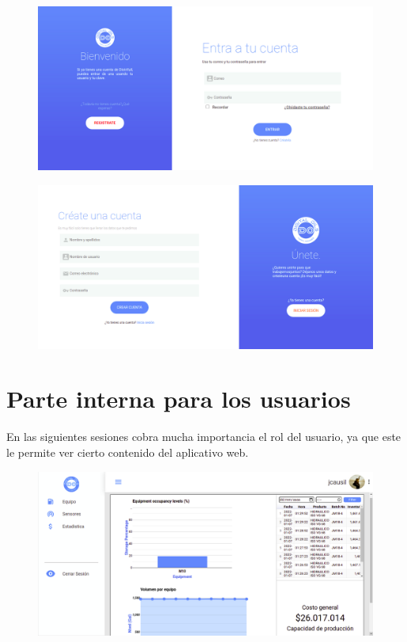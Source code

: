 \begin{figure}[!]
	\centering
	\includegraphics[width=1\linewidth, height=0.4\textheight]{imagenes/inicioSesion}
	\caption[Inicio de sesi\'on.]{}
	\label{fig:iniciosesion}
\end{figure}

\begin{figure}[!]
	\centering
	\includegraphics[width=1\linewidth, height=0.4\textheight]{imagenes/registro}
	\caption[Registro de sesi\'on.]{}
	\label{fig:registro}
\end{figure}

\section{Parte interna para los usuarios}
En las siguientes sesiones cobra mucha importancia el rol del usuario, ya que este le permite ver cierto contenido del aplicativo web. 

\begin{figure}[h!]
	\centering
	\includegraphics[width=1\linewidth, height=0.4\textheight]{imagenes/dashboardAdmi}
	\caption[Primera parte del inicio.]{}
	\label{fig:dashboardAdmi}
\end{figure}



